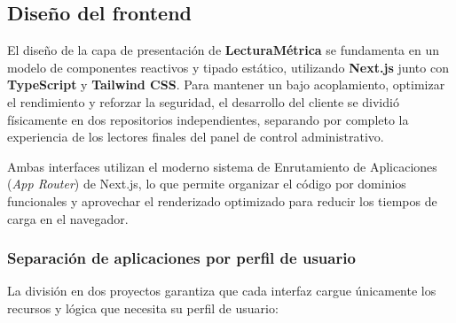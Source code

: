 \documentclass[12pt, atypical, journal]{article}
\begin{document}
\subsection{Diseño del frontend}

El diseño de la capa de presentación de \textbf{LecturaMétrica} se fundamenta en un modelo de componentes reactivos y tipado estático, utilizando \textbf{Next.js} junto con \textbf{TypeScript} y \textbf{Tailwind CSS}. Para mantener un bajo acoplamiento, optimizar el rendimiento y reforzar la seguridad, el desarrollo del cliente se dividió físicamente en dos repositorios independientes, separando por completo la experiencia de los lectores finales del panel de control administrativo.

Ambas interfaces utilizan el moderno sistema de Enrutamiento de Aplicaciones (\textit{App Router}) de Next.js, lo que permite organizar el código por dominios funcionales y aprovechar el renderizado optimizado para reducir los tiempos de carga en el navegador.

\subsubsection{Separación de aplicaciones por perfil de usuario}
La división en dos proyectos garantiza que cada interfaz cargue únicamente los recursos y lógica que necesita su perfil de usuario:
\end{document}
